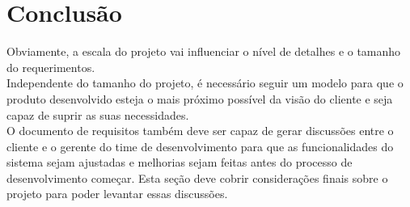 \documentclass[12pt,a4paper,final]{report}
\begin{document}
\section*{Conclusão}

Obviamente, a escala do projeto vai influenciar o nível de detalhes e o tamanho do requerimentos.\\
Independente do tamanho do projeto, é necessário seguir um modelo para que o produto desenvolvido esteja o mais próximo possível da visão do cliente e seja capaz de suprir as suas necessidades.\\
O documento de requisitos também deve ser capaz de gerar discussões entre o cliente e o gerente do time de desenvolvimento para que as funcionalidades do sistema sejam ajustadas e melhorias sejam feitas antes do processo de desenvolvimento começar.
Esta seção deve cobrir considerações finais sobre o projeto para poder levantar essas discussões.
\end{document}
